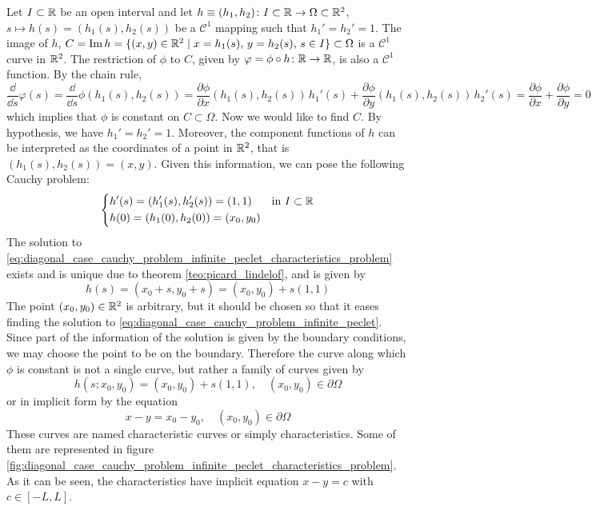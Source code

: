 \clearpage
Let $I \subset \mathbb{R}$ be an open interval and let $h \equiv (h_1, h_2) \colon I
\subset \mathbb{R} \rightarrow \Omega \subset \mathbb{R}^2$, $s \mapsto h(s) = (h_1(s),
h_2(s))$ be a $\mathcal{C}^1$ mapping such that $h_1' = h_2' = 1$. The image of
$h$, $C = \operatorname{Im}{h} = \{ (x, y) \in \mathbb{R}^2 \mid x = h_1(s), \, y = h_2(s), \, s
\in I \} \subset \Omega$ is a $\mathcal{C}^1$ curve in $\mathbb{R}^2$. The
restriction of $\phi$ to  $C$, given by $\varphi = \phi \circ h \colon \mathbb{R}
\rightarrow \mathbb{R}$, is also a $\mathcal{C}^1$ function. By the chain rule,
\begin{equation} 
	\frac{\dd}{\dd{s}} \varphi(s) = 
	\frac{\dd}{\dd{s}} \phi(h_1(s), h_2(s)) = 
	\frac{\partial \phi}{\partial x} (h_1(s), h_2(s)) \, h_1'(s) + 
	\frac{\partial \phi}{\partial y} (h_1(s), h_2(s)) \, h_2'(s) =
	\frac{\partial \phi}{\partial x} + \frac{\partial \phi}{\partial y} = 0
\end{equation}
which implies that $\phi$ is constant on $C \subset \Omega$. Now we would like
to find $C$. By hypothesis, we have $h_1' = h_2' = 1$. Moreover, the component
functions of $h$ can be interpreted as the coordinates of a point in $\mathbb{R}^2$,
that is $(h_1(s), h_2(s)) = (x, y)$. Given this information, we can pose the
following Cauchy problem:
\begin{equation} 
	\left\{
	\begin{aligned}
		&h'(s) = (h_1'(s), h_2'(s)) = (1, 1) & &\text{in } I \subset \mathbb{R} \\
		&h(0) = (h_1(0), h_2(0)) = (x_0, y_0)
	\end{aligned}
	\right.
\end{equation}
The solution to
\eqref{eq:diagonal_case_cauchy_problem_infinite_peclet_characteristics_problem}
exists and is unique due to theorem \ref{teo:picard_lindelof}, and is given by
\begin{equation}
	h(s) = (x_0 + s, y_0 + s) = (x_0, y_0) + s(1, 1)
\end{equation}
The point $(x_0, y_0) \in \mathbb{R}^2$ is arbitrary, but it should be chosen so that
it eases finding the solution to
\eqref{eq:diagonal_case_cauchy_problem_infinite_peclet}. Since part of the
information of the solution is given by the boundary conditions, we may choose
the point to be on the boundary. Therefore the curve along which $\phi$ is
constant is not a single curve, but rather a family of curves given by
\begin{equation}
	h(s; x_0, y_0) = (x_0, y_0) + s(1, 1), \quad (x_0, y_0) \in \partial \Omega
\end{equation}
or in implicit form by the equation
\begin{equation} \label{eq:diagonal_case_cauchy_problem_infinite_peclet_characteristics_implicit_form}
	x - y = x_0 - y_0, \quad (x_0, y_0) \in \partial \Omega
\end{equation}
These curves are named characteristic curves or simply characteristics. Some of
them are represented in figure
\ref{fig:diagonal_case_cauchy_problem_infinite_peclet_characteristics_problem}.
As it can be seen, the characteristics have implicit equation $x - y = c$ with
$c \in [-L, L]$.

